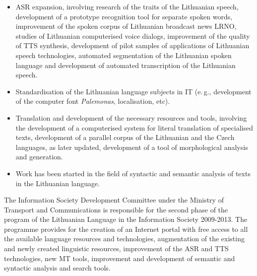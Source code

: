 \begin{multicols}{2}
\begin{itemize}
\item ASR expansion, involving research of the traits of the Lithuanian speech, development of a prototype recognition tool for separate spoken words, improvement of the spoken corpus of Lithuanian broadcast news LRNO, studies of Lithuanian computerised voice dialogs, improvement of the quality of TTS synthesis, development of pilot samples of applications of Lithuanian speech technologies, automated segmentation of the Lithuanian spoken language and development of automated transcription of the Lithuanian speech.
\item Standardisation of the Lithuanian language subjects in IT (e.\,g., development of the computer font \textit{Palemonas}, localisation, etc).
\item Translation and development of the necessary resources and tools, involving the development of a computerised system for literal translation of specialised texts, development of a parallel corpus of the Lithuanian and the Czech languages, as later updated, development of a tool of morphological analysis and generation.
\item Work has been started in the field of syntactic and semantic analysis of texts in the Lithuanian language. 
\end{itemize}

The Information Society Development Committee under the Ministry of Transport and Communications is responsible for the second phase of the program of the Lithuanian Language in the Information Society 2009-2013. The programme provides for the creation of an Internet portal with free access to all the available language resources and technologies, augmentation of the existing and newly created linguistic resources, improvement of the ASR and TTS technologies, new MT tools, improvement and development of semantic and syntactic analysis and search tools.


\end{multicols}
